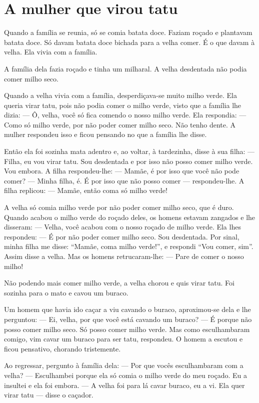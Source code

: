\chapter{A mulher que virou tatu}

Quando a família se reunia, só se comia
batata doce. Faziam roçado e plantavam
batata doce. Só davam batata doce bichada
para a velha comer. É o que davam à velha.
Ela vivia com a família.

A família dela fazia roçado e tinha
um milharal. A velha desdentada
não podia comer milho seco.

Quando a velha vivia com
a família, desperdiçava-se
muito milho verde.
Ela queria virar tatu, pois
não podia comer o milho verde,
visto que a família lhe dizia:
— Ô, velha, você só fica
comendo o nosso milho verde.
Ela respondia:
— Como só milho verde, por
não poder comer milho seco.
Não tenho dente.
A mulher respondeu isso
e ficou pensando no que
a família lhe disse.

Então ela foi sozinha mata
adentro e, ao voltar, à
tardezinha, disse à sua filha:
— Filha, eu vou virar tatu. Sou
desdentada e por isso não posso
comer milho verde. Vou embora.
A filha respondeu-lhe:
— Mamãe, é por isso que
você não pode comer?
— Minha filha, é. É por isso que
não posso comer — respondeu-lhe.
A filha replicou:
— Mamãe, então coma
só milho verde!

A velha só comia milho
verde por não poder comer
milho seco, que é duro.
Quando acabou o milho verde
do roçado deles, os homens
estavam zangados
e lhe disseram:
— Velha, você acabou com o
nosso roçado de milho verde.
Ela lhes respondeu:
— É por não poder comer milho
seco. Sou desdentada. Por
sinal, minha filha me disse:
“Mamãe, coma milho verde!”, e
respondi “Vou comer, sim”.
Assim disse a velha. Mas os
homens retrucaram-lhe:
— Pare de comer o nosso milho!

Não podendo mais comer milho verde,
a velha chorou e quis virar tatu.
Foi sozinha para o mato e cavou um buraco.

Um homem que havia ido caçar a viu
cavando o buraco, aproximou-se
dela e lhe perguntou:
— Ei, velha, por que você
está cavando um buraco?
— É porque não posso comer milho seco.
Só posso comer milho verde. Mas como
esculhambaram comigo, vim cavar um
buraco para ser tatu, respondeu.
O homem a escutou e ficou pensativo,
chorando tristemente.

Ao regressar, pergunto
à família dela:
— Por que vocês
esculhambaram com a velha?
— Esculhambei porque ela só
comia o milho verde do meu
roçado. Eu a insultei e
ela foi embora.
— A velha foi para lá cavar
buraco, eu a vi. Ela quer virar
tatu — disse o caçador.

